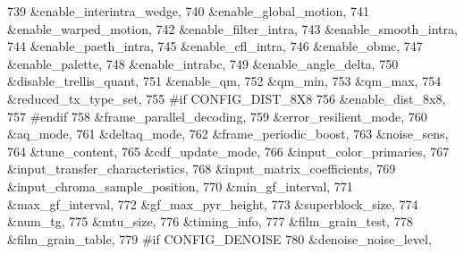 \begin{DoxyCodeInclude}
{{{{{{{739                                        &enable\_interintra\_wedge,
740                                        &enable\_global\_motion,
741                                        &enable\_warped\_motion,
742                                        &enable\_filter\_intra,
743                                        &enable\_smooth\_intra,
744                                        &enable\_paeth\_intra,
745                                        &enable\_cfl\_intra,
746                                        &enable\_obmc,
747                                        &enable\_palette,
748                                        &enable\_intrabc,
749                                        &enable\_angle\_delta,
750                                        &disable\_trellis\_quant,
751                                        &enable\_qm,
752                                        &qm\_min,
753                                        &qm\_max,
754                                        &reduced\_tx\_type\_set,
755 \textcolor{preprocessor}{#if CONFIG\_DIST\_8X8}
756                                        &enable\_dist\_8x8,
757 \textcolor{preprocessor}{#endif}
758                                        &frame\_parallel\_decoding,
759                                        &error\_resilient\_mode,
760                                        &aq\_mode,
761                                        &deltaq\_mode,
762                                        &frame\_periodic\_boost,
763                                        &noise\_sens,
764                                        &tune\_content,
765                                        &cdf\_update\_mode,
766                                        &input\_color\_primaries,
767                                        &input\_transfer\_characteristics,
768                                        &input\_matrix\_coefficients,
769                                        &input\_chroma\_sample\_position,
770                                        &min\_gf\_interval,
771                                        &max\_gf\_interval,
772                                        &gf\_max\_pyr\_height,
773                                        &superblock\_size,
774                                        &num\_tg,
775                                        &mtu\_size,
776                                        &timing\_info,
777                                        &film\_grain\_test,
778                                        &film\_grain\_table,
779 \textcolor{preprocessor}{#if CONFIG\_DENOISE}
780                                        &denoise\_noise\_level,
}}}}}}}
\end{DoxyCodeInclude}
